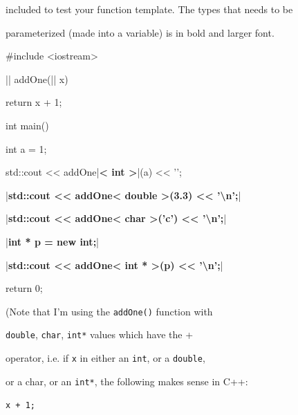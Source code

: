 included to test your function template. The types that needs to be

parameterized (made into a variable) is in bold and larger font.



\begin{consolethree}[escapeinside=||]

#include <iostream>



|| addOne(|| x)

{

    return x + 1;

}



int main()

{

    int a = 1;

    std::cout << addOne|\textbf{< int >}|(a) << '\n';

    |\textbf{std::cout << addOne< double >(3.3) << '\textbackslash n';}|

    |\textbf{std::cout << addOne< char >('c') << '\textbackslash n';}|



    |\textbf{int * p = new int;}|

    |\textbf{std::cout << addOne< int * >(p) << '\textbackslash n';}|



    return 0;

}

\end{consolethree}



(Note that I'm using the \texttt{addOne()} function with

\texttt{double}, \texttt{char}, \texttt{int*} values which have the +

operator, i.e. if \texttt{x} in either an \texttt{int}, or a \texttt{double},

or a char, or an \texttt{int*}, the following makes sense in C++:



\verb!x + 1;!



